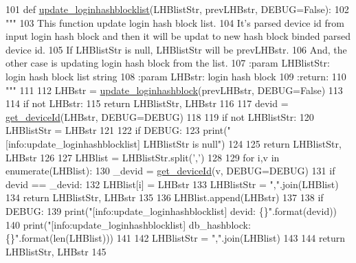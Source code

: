 \begin{DoxyCode}
101 \textcolor{keyword}{def }\hyperlink{namespaceloginhashblock_a2bcc7ddd0fcc3788572dd77808cb624d}{update\_loginhashblocklist}(LHBlistStr, prevLHBstr, DEBUG=False):
102     \textcolor{stringliteral}{"""}
103 \textcolor{stringliteral}{    This function update login hash block list. }
104 \textcolor{stringliteral}{    It's parsed device id from input login hash block and then it will be updat to new hash block binded
       parsed device id. }
105 \textcolor{stringliteral}{    If LHBlistStr is null, LHBlistStr will be prevLHBstr. }
106 \textcolor{stringliteral}{    And, the other case is updating login hash block from the list.}
107 \textcolor{stringliteral}{    :param LHBlistStr: login hash block list string}
108 \textcolor{stringliteral}{    :param LHBstr: login hash block}
109 \textcolor{stringliteral}{    :return:}
110 \textcolor{stringliteral}{    """}
111 
112     LHBstr = \hyperlink{namespaceloginhashblock_afef75d97c834ce0fda711b93d0b56b00}{update\_loginhashblock}(prevLHBstr, DEBUG=\textcolor{keyword}{False})
113 
114     \textcolor{keywordflow}{if} \textcolor{keywordflow}{not} LHBstr:
115         \textcolor{keywordflow}{return} LHBlistStr, LHBstr
116 
117     devid = \hyperlink{namespaceloginhashblock_a17417f2f6bca76ab51170082a562e5f6}{get\_deviceId}(LHBstr, DEBUG=DEBUG)
118 
119     \textcolor{keywordflow}{if} \textcolor{keywordflow}{not} LHBlistStr:
120         LHBlistStr = LHBstr
121         
122         \textcolor{keywordflow}{if} DEBUG:
123             print(\textcolor{stringliteral}{"[info:update\_loginhashblocklist] LHBlistStr is null"})
124 
125         \textcolor{keywordflow}{return} LHBlistStr, LHBstr
126 
127     LHBlist = LHBlistStr.split(\textcolor{stringliteral}{','})
128 
129     \textcolor{keywordflow}{for} i,v \textcolor{keywordflow}{in} enumerate(LHBlist):
130         \_devid = \hyperlink{namespaceloginhashblock_a17417f2f6bca76ab51170082a562e5f6}{get\_deviceId}(v, DEBUG=DEBUG)
131         \textcolor{keywordflow}{if} devid == \_devid:
132             LHBlist[i] = LHBstr
133             LHBlistStr = \textcolor{stringliteral}{","}.join(LHBlist)
134             \textcolor{keywordflow}{return} LHBlistStr, LHBstr
135 
136     LHBlist.append(LHBstr)
137 
138     \textcolor{keywordflow}{if} DEBUG:
139         print(\textcolor{stringliteral}{"[info:update\_loginhashblocklist] devid: \{\}"}.format(devid))
140         print(\textcolor{stringliteral}{"[info:update\_loginhashblocklist] db\_hashblock: \{\}"}.format(len(LHBlist)))
141 
142     LHBlistStr = \textcolor{stringliteral}{","}.join(LHBlist)
143 
144     \textcolor{keywordflow}{return} LHBlistStr, LHBstr
145 
\end{DoxyCode}


